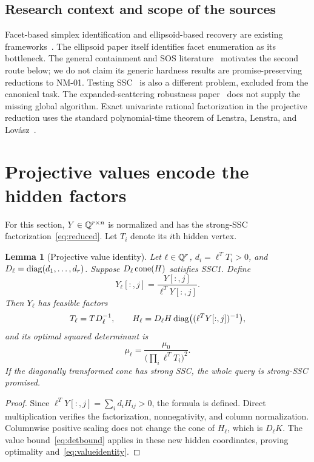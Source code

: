 \documentclass[11pt]{article}
\newtheorem{lemma}[theorem]{Lemma}
\theoremstyle{definition}\newtheorem{definition}[theorem]{Definition}
\begin{document}
\subsection{Research context and scope of the sources}
Facet-based simplex identification and ellipsoid-based recovery are existing frameworks~\cite{abd,gillisbook,lin}. The ellipsoid paper itself identifies facet enumeration as its bottleneck. The general containment and SOS literature~\cite{ktt,kt} motivates the second route below; we do not claim its generic hardness results are promise-preserving reductions to NM-01. Testing SSC~\cite{gillisl} is also a different problem, excluded from the canonical task. The expanded-scattering robustness paper~\cite{robust} does not supply the missing global algorithm. Exact univariate rational factorization in the projective reduction uses the standard polynomial-time theorem of Lenstra, Lenstra, and Lov\'asz~\cite{lll}.

\section{Projective values encode the hidden factors}
\label{sec:projective}
For this section, $Y\in\mathbb Q^{r\times n}$ is normalized and has the strong-SSC factorization~\eqref{eq:reduced}. Let $T_i$ denote its $i$th hidden vertex.

\begin{lemma}[Projective value identity]
\label{lem:projective}
Let $\ell\in\mathbb Q^r$, $d_i=\ell^TT_i>0$, and $D_\ell=\operatorname{diag}(d_1,\ldots,d_r)$. Suppose $D_\ell\operatorname{cone}(H)$ satisfies SSC1. Define
\begin{equation}
 Y_\ell[:,j]=\frac{Y[:,j]}{\ell^TY[:,j]}.
 \label{eq:projdata}
\end{equation}
Then $Y_\ell$ has feasible factors
\begin{equation}
 T_\ell=TD_\ell^{-1},\qquad
 H_\ell=D_\ell H\operatorname{diag}\bigl((\ell^TY[:,j])^{-1}\bigr),
\end{equation}
and its optimal squared determinant is
\begin{equation}
 \mu_\ell=\frac{\mu_0}{\bigl(\prod_i\ell^TT_i\bigr)^2}.
 \label{eq:valueidentity}
\end{equation}
If the diagonally transformed cone has strong SSC, the whole query is strong-SSC promised.
\end{lemma}
\begin{proof}
Since $\ell^TY[:,j]=\sum_i d_iH_{ij}>0$, the formula is defined. Direct multiplication verifies the factorization, nonnegativity, and column normalization. Columnwise positive scaling does not change the cone of $H_\ell$, which is $D_\ell K$. The value bound~\eqref{eq:detbound} applies in these new hidden coordinates, proving optimality and~\eqref{eq:valueidentity}.
\end{proof}
\end{document}
